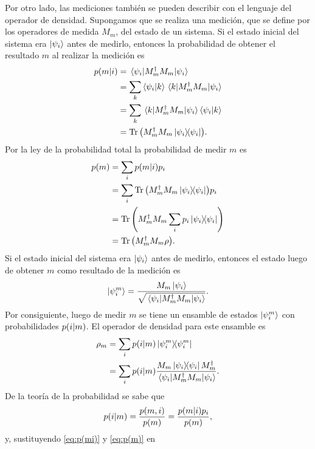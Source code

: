 Por otro lado, las mediciones también se pueden describir con el 
lenguaje del operador de densidad. Supongamos que se realiza una medición, 
que se define por los operadores de medida $M_m$, del estado de un sistema. 
Si el estado inicial del sistema era $\ket{\psi_i}$ antes de medirlo, 
entonces la probabilidad de obtener el resultado $m$ al realizar
la medición es
\begin{align}
	p\qty(m|i) &= \matrixel{\psii}{M_m^{\dagger}M_m}{\psii}\\
	&= \sum _k \braket{\psii}{k}\matrixel{k}{M_m^{\dagger}M_m}{\psii}\\
	&=\sum _k \matrixel{k}{M_m^{\dagger}M_m}{\psii}\braket{\psii}{k}\\
	&=\Tr \qty(M_m^{\dagger}M_m\dyad{\psii}{\psii}). \label{eq:p(mi)}
\end{align}
Por la ley de la probabilidad total la probabilidad de medir $m$ es
\begin{align}
	p(m) &= \sum_i p(m\vert i)p_i \\
			 &= \sum_i \Tr \qty(M_m^{\dagger}M_m\dyad{\psii}{\psii})p_i \\
			 &= \Tr \qty(M_m^{\dagger}M_m\sum_ip_i\dyad{\psii}{\psii}) \\
			 &= \Tr \qty(M_m^{\dagger}M_m\rho). \label{eq:p(m)}
\end{align}
Si el estado inicial del sistema era $\ket{\psi_{i} }$ antes de medirlo, 
entonces el estado luego de obtener $m$ como resultado de la medición es
\begin{align}
	\ket{\psi_i^m} = \frac{M_m\Pk{i}}{\sqrt{\matrixel{\psii}{M_m^{\dagger}
	M_m}{\psii}}}.
\end{align}
Por consiguiente, luego de medir $m$ se tiene un ensamble de estados
$\ket{\psi_i^m}$ con probabilidades $p\qty(i\vert m)$. El operador
de densidad para este ensamble es
\begin{align}
	\rho_m &= \sum _i p\qty(i\vert m)\dyad{\psii^m}{\psii^m}
	\nonumber \\
				 &= \sum _i p\qty(i\vert m)
				 \frac{M_m\dyad{\psii}{\psii}M_m^{\dagger}}
				 {\matrixel{\psii}{M_m^{\dagger}M_m}{\psii}}. 
				 \label{eq:rho-after-measurement}
\end{align}
De la teoría de la probabilidad se sabe que
\begin{align}
	p\qty(i\vert m) = \frac{p(m,i)}{p(m)}=
	\frac{p\qty(m\vert i)p_i}{p(m)},
\end{align}
y, sustituyendo \eqref{eq:p(mi)} y \eqref{eq:p(m)} en 
